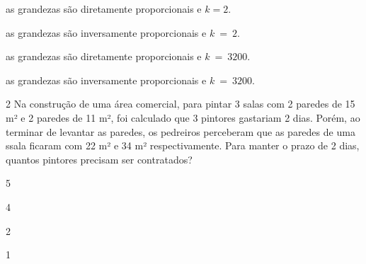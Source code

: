 \begin{escolha}[itemsep=0pt]
\item as grandezas são diretamente proporcionais e $k  =  2$.
\item as grandezas são inversamente proporcionais e $k\  = \ 2$.
\item as grandezas são diretamente proporcionais e $k\  = \ 3200$.
\item as grandezas são inversamente proporcionais e $k\  = \ 3200$.
\end{escolha}



\num{2} Na construção de uma área comercial, para pintar 3 salas com 2
paredes de 15 m² e 2 paredes de 11 m², foi calculado que 3 pintores
gastariam 2 dias. Porém, ao terminar de levantar as paredes, os
pedreiros perceberam que as paredes de uma ssala ficaram com 22 m² e 34
m² respectivamente. Para manter o prazo de 2 dias, quantos pintores
precisam ser contratados?

\begin{escolha}[itemsep=0pt]
\item 5
\item 4
\item 2
\item 1
\end{escolha}


